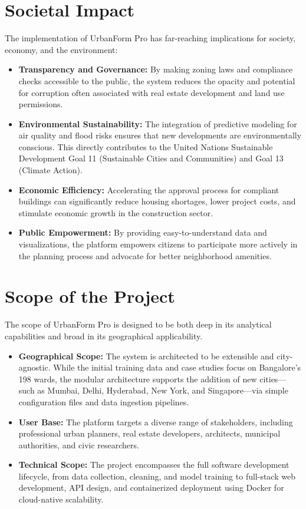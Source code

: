 \documentclass[12pt,a4paper]{report}
\begin{document}
\section{Societal Impact}
The implementation of UrbanForm Pro has far-reaching implications for society, economy, and the environment:
\begin{itemize}
    \item \textbf{Transparency and Governance:} By making zoning laws and compliance checks accessible to the public, the system reduces the opacity and potential for corruption often associated with real estate development and land use permissions.
    \item \textbf{Environmental Sustainability:} The integration of predictive modeling for air quality and flood risks ensures that new developments are environmentally conscious. This directly contributes to the United Nations Sustainable Development Goal 11 (Sustainable Cities and Communities) and Goal 13 (Climate Action).
    \item \textbf{Economic Efficiency:} Accelerating the approval process for compliant buildings can significantly reduce housing shortages, lower project costs, and stimulate economic growth in the construction sector.
    \item \textbf{Public Empowerment:} By providing easy-to-understand data and visualizations, the platform empowers citizens to participate more actively in the planning process and advocate for better neighborhood amenities.
\end{itemize}

\section{Scope of the Project}
The scope of UrbanForm Pro is designed to be both deep in its analytical capabilities and broad in its geographical applicability.
\begin{itemize}
    \item \textbf{Geographical Scope:} The system is architected to be extensible and city-agnostic. While the initial training data and case studies focus on Bangalore's 198 wards, the modular architecture supports the addition of new cities—such as Mumbai, Delhi, Hyderabad, New York, and Singapore—via simple configuration files and data ingestion pipelines.
    \item \textbf{User Base:} The platform targets a diverse range of stakeholders, including professional urban planners, real estate developers, architects, municipal authorities, and civic researchers.
    \item \textbf{Technical Scope:} The project encompasses the full software development lifecycle, from data collection, cleaning, and model training to full-stack web development, API design, and containerized deployment using Docker for cloud-native scalability.
\end{itemize}
\end{document}
